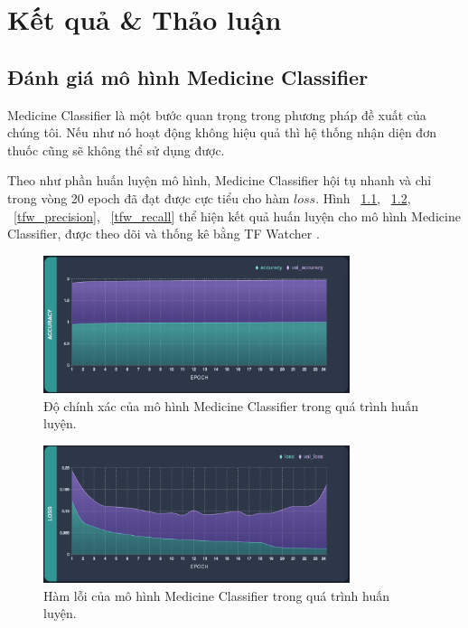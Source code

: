 \chapter{Kết quả \& Thảo luận}
\label{Chapter5}

\section{Đánh giá mô hình Medicine Classifier}

Medicine Classifier là một bước quan trọng trong phương pháp đề xuất  của chúng tôi. Nếu như nó hoạt động không hiệu quả thì hệ thống nhận diện đơn thuốc cũng sẽ không thể sử dụng được.

Theo như phần huấn luyện mô hình, Medicine Classifier hội tụ nhanh và chỉ trong vòng 20 epoch đã đạt được cực tiểu cho hàm $loss$. Hình ~\ref{tfw_acc}, ~\ref{tfw_loss}, ~\ref{tfw_precision}, ~\ref{tfw_recall} thể hiện kết quả huấn luyện cho mô hình Medicine Classifier, được theo dõi và thống kê bằng TF Watcher \cite{TFWatcher}. 

\begin{figure}
\centering
\includegraphics[width=0.8\textwidth]{mep_img/tfw_acc.png}
\caption{Độ chính xác của mô hình Medicine Classifier trong quá trình huấn luyện.}\label{tfw_acc}
\end{figure}

\begin{figure}
\centering
\includegraphics[width=0.8\textwidth]{mep_img/tfw_loss.png}
\caption{Hàm lỗi của mô hình Medicine Classifier trong quá trình huấn luyện.}\label{tfw_loss}
\end{figure}

